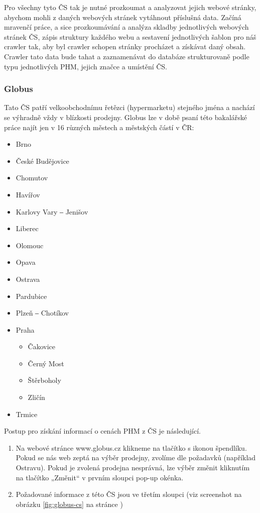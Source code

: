 Pro všechny tyto ČS tak je nutné prozkoumat a analyzovat jejich webové
stránky, abychom mohli z daných webových stránek vytáhnout příslušná data.
Začíná mravenčí práce, a sice prozkoumávání a analýza skladby jednotlivých
webových stránek ČS, zápis struktury každého webu a sestavení jednotlivých
šablon pro náš crawler tak, aby byl crawler schopen stránky procházet
a získávat daný obsah. Crawler tato data bude tahat a zaznamenávat
do databáze strukturovaně podle typu jednotlivých PHM, jejich značce
a umístění ČS.

\subsubsection{Globus}

Tato ČS patří velkoobchodnímu řetězci (hypermarketu) stejného jména
a nachází se výhradně vždy v blízkosti prodejny. Globus lze v době
psaní této bakalářské práce najít jen v 16 různých městech a městských
částí v ČR:

\begin{itemize}
    \item Brno
    \item České Budějovice
    \item Chomutov
    \item Havířov
    \item Karlovy Vary ‒ Jenišov
    \item Liberec
    \item Olomouc
    \item Opava
    \item Ostrava
    \item Pardubice
    \item Plzeň ‒ Chotíkov
    \item Praha
    \begin{itemize}
        \item Čakovice
        \item Černý Most
        \item Štěrboholy
        \item Zličín
    \end{itemize}
    \item Trmice
\end{itemize}

Postup pro získání informací o cenách PHM z ČS je následující.

\begin{enumerate}
    \item Na webové stránce www.globus.cz klikneme na tlačítko s ikonou
        špendlíku. Pokud se nás web zeptá na výběr prodejny, zvolíme
        dle požadavků (například Ostravu). Pokud je zvolená prodejna
        nesprávná, lze výběr změnit kliknutím na tlačítko „Změnit“
        v prvním sloupci pop-up okénka.
    \item Požadované informace z této ČS jsou ve třetím sloupci (viz
        screenshot na obrázku \ref{fig:globus-cs} na stránce
        \pageref{fig:globus-cs})
\end{enumerate}


